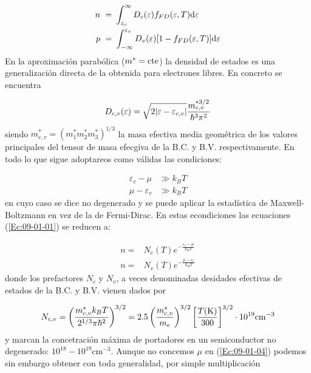 \begin{equation}
\begin{split}
	n \ = \ & \int_{\varepsilon_c}^{\infty} D_c (\varepsilon) f_{FD} (\varepsilon,T) \mathrm{d} \varepsilon \\
	p \ = \ & \int_{-\infty}^{\varepsilon_v} D_v (\varepsilon) [1-f_{FD}(\varepsilon,T)]\mathrm{d} \varepsilon
\end{split}\label{Ec:09-01-01}
\end{equation}
En la aproximación parabólica ($m^* = \text{cte}$) la densidad de estados es una generalización directa de la obtenida para electrones libres. En concreto se encuentra

\begin{equation}
	D_{c,v} (\varepsilon) = \sqrt{2\abs{\varepsilon-\varepsilon_{c,v}}} \frac{m_{c,v}^{*3/2}}{\hbar^3 \pi^2}
\end{equation}
siendo $m_{c,v}^*=(m_1^*m_2^*m_3^*)^{1/3}$ la masa efectiva media geométrica de los valores principales del tensor de masa efecgiva de la B.C. y B.V. respectivamente. En todo lo que sigue adoptareos como válidas las condiciones:

\begin{equation}
\begin{split}
\varepsilon_c  - \mu & \gg k_B T \\
\mu - \varepsilon_v & \gg k_B T
\end{split} \label{Ec:09-01-03}
\end{equation}
en cuyo caso se dice no degenerado y se puede aplicar la estadística de Maxwell-Boltzmann en vez de la de Fermi-Dirac. En estas econdiciones las ecuaciones (\ref{Ec:09-01-01}) se reducen a:

\begin{equation}
	\begin{split}
		n = & N_c (T) e^{- \frac{\varepsilon_c - \mu}{k_B T}} \\
		n = & N_v (T) e^{- \frac{\mu-\varepsilon_v}{k_B T}} 
	\end{split} \label{Ec:09-01-04}
\end{equation}
donde los prefactores $N_c$ y $N_v$, a veces denominadas desidades efectivas de estados de la B.C. y B.V. vienen dados por

\begin{equation}
	N_{c,v}= \parentesis{\frac{m_{c,v}^* k_B T}{2^{1/3} \pi \hbar^2}}^{3/2} = 2.5 \parentesis{\frac{m_{c,v}^*}{m_e}}^{3/2} \ccorchetes{\frac{T(\text{K})}{300}}^{3/2} \cdot \unit{10^{19} \cm^{-3}} \label{Ec:09-01-05}
\end{equation}
y marcan la concetración máxima de portadores en un semiconductor no degenerado: $\unit{10^{18}-10^{19} \cm^{-3}}$. Aunque no concemos $\mu$ en (\ref{Ec:09-01-04}) podemos sin embargo obtener con toda generalidad, por simple multiplicación 

